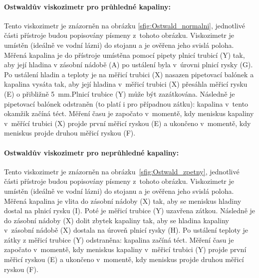 \documentclass[12pt]{article}
\begin{document}
\paragraph{Ostwaldův viskozimetr pro průhledné kapaliny:}
Tento viskozimetr je znázorněn na obrázku \ref{sfig:Ostwald_normalni}, jednotlivé části přístroje budou popisovány písmeny z~tohoto obrázku. Viskozimetr je umístěn (ideálně ve vodní lázni) do stojanu a je ověřena jeho svislá poloha. Měřená kapalina je do přístroje umístěna pomocí pipety plnicí trubicí (Y) tak, aby její hladina v zásobní nádobě (A) po ustálení byla v~úrovni plnicí rysky (G). Po ustálení hladin a teploty je na měřicí trubici (X) nasazen pipetovací balónek a kapalina vysáta tak, aby její hladina v~měřicí trubici (X) přesáhla měřicí rysku (E) o přibližně \SI{5}{\milli\metre}.\footnotemark Plnicí trubice (Y) může být zazátkována. Následně je pipetovací balónek odstraněn (to platí i pro případnou zátku): kapalina v~tento okamžik začíná téct. Měření času je započato v~momentě, kdy meniskus kapaliny v~měřící trubici (X) projde první měřicí ryskou (E) a ukončeno v~momentě, kdy meniskus projde druhou měřicí ryskou (F).~\cite{book:Calibration_of_viscometers}

\paragraph{Ostwaldův viskozimetr pro neprůhledné kapaliny:}
Tento viskozimetr je znázorněn na obrázku~\ref{sfig:Ostwald_zpetny}, jednotlivé části přístroje budou popisovány písmeny z~tohoto obrázku. Viskozimetr je umístěn (ideálně ve vodní lázni) do stojanu a je ověřena jeho svislá poloha. Měřená kapalina je vlita do zásobní nádoby (X) tak, aby se meniskus hladiny dostal na plnicí rysku (I). Poté je měřicí trubice (Y) uzavřena zátkou. Následně je do zásobní nádoby (X) dolit zbytek kapaliny tak, aby se hladina kapaliny v~zásobní nádobě (X) dostala na úroveň plnicí rysky (H). Po ustálení teploty je zátky z měřicí trubice (Y) odstraněna: kapalina začíná téct. Měření času je započato v~momentě, kdy meniskus kapaliny v~měřicí trubici (Y) projde první měřicí ryskou (E) a ukončeno v~momentě, kdy meniskus projde druhou měřicí ryskou (F).~\cite{book:Calibration_of_viscometers}
\end{document}
